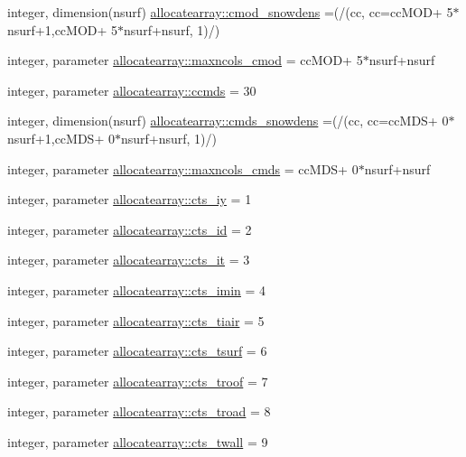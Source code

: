\begin{DoxyCompactItemize}
integer, dimension(nsurf) \hyperlink{namespaceallocatearray_a8c1534662d6320cff6200cb5f241b500}{allocatearray\+::cmod\+\_\+snowdens} =(/(cc, cc=cc\+M\+OD+ 5$\ast$nsurf+1,cc\+M\+OD+ 5$\ast$nsurf+nsurf, 1)/)
\item 
integer, parameter \hyperlink{namespaceallocatearray_a1f140f40b2405f3685b595a167d59b2e}{allocatearray\+::maxncols\+\_\+cmod} = cc\+M\+OD+ 5$\ast$nsurf+nsurf
\item 
integer, parameter \hyperlink{namespaceallocatearray_abfa2ffdfa390b59bfba25c0870b6da2c}{allocatearray\+::ccmds} = 30
\item 
integer, dimension(nsurf) \hyperlink{namespaceallocatearray_a6fba2ffdba3b558c1dc85a829631f700}{allocatearray\+::cmds\+\_\+snowdens} =(/(cc, cc=cc\+M\+DS+ 0$\ast$nsurf+1,cc\+M\+DS+ 0$\ast$nsurf+nsurf, 1)/)
\item 
integer, parameter \hyperlink{namespaceallocatearray_ac7c54d53f039b450b99ecd7eab5ab826}{allocatearray\+::maxncols\+\_\+cmds} = cc\+M\+DS+ 0$\ast$nsurf+nsurf
\item 
integer, parameter \hyperlink{namespaceallocatearray_a165cbd46d15b1be6549629fe4eb6a19b}{allocatearray\+::cts\+\_\+iy} = 1
\item 
integer, parameter \hyperlink{namespaceallocatearray_a6285a744db8c15d81b15f57a83d1f8ca}{allocatearray\+::cts\+\_\+id} = 2
\item 
integer, parameter \hyperlink{namespaceallocatearray_a4690f68ad73fabe21fba5fc6e6931f79}{allocatearray\+::cts\+\_\+it} = 3
\item 
integer, parameter \hyperlink{namespaceallocatearray_a99b48eb99410f19ee1b4a36b352375d4}{allocatearray\+::cts\+\_\+imin} = 4
\item 
integer, parameter \hyperlink{namespaceallocatearray_ae57700f7e469dcff88a8171f36d6fa99}{allocatearray\+::cts\+\_\+tiair} = 5
\item 
integer, parameter \hyperlink{namespaceallocatearray_ad02b4cda49767ea25a5e15fb67d4602a}{allocatearray\+::cts\+\_\+tsurf} = 6
\item 
integer, parameter \hyperlink{namespaceallocatearray_afddbb695f2997c5edb8390f3caa3b9fa}{allocatearray\+::cts\+\_\+troof} = 7
\item 
integer, parameter \hyperlink{namespaceallocatearray_a4cbae097c6099b5e1325f2e2a2cbc440}{allocatearray\+::cts\+\_\+troad} = 8
\item 
integer, parameter \hyperlink{namespaceallocatearray_a2881a82b636f70de7b82aa51e82d6fb0}{allocatearray\+::cts\+\_\+twall} = 9
\item 

\end{DoxyCompactItemize}
